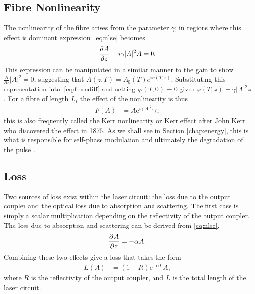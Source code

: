 \subsection{Fibre Nonlinearity}
The nonlinearity of the fibre arises from the parameter $\gamma$; in regions where this effect is dominant expression~\eqref{eq:nlse} becomes
\begin{align}
\label{eq:fibrediff}
	\frac{\partial^{}A}{\partial{z}^{}} - i \gamma |A|^2 A = 0.
\end{align}
This expression can be manipulated in a similar manner to the gain to show $\frac{\partial}{\partial z} |A|^2 = 0$, suggesting that $A(z,T) = A_0(T) e^{i \varphi(T,z)}$. Substituting this representation into~\eqref{eq:fibrediff} and setting $\varphi(T,0)=0$ gives $\varphi(T,z) = \gamma |A|^2 z$. For a fibre of length $L_f$ the effect of the nonlinearity is thus
\begin{align*}
F(A) &= A \textrm{e}^{i \gamma |A|^2 L_f},
\end{align*}
this is also frequently called the Kerr nonlinearity or Kerr effect after John Kerr who discovered the effect in 1875. As we shall see in Section \ref{chap:energy}, this is what is responsible for self-phase modulation and ultimately the degradation of the pulse \cite{desurvire, dunlop, martinez1984, tamura}.

\subsection{Loss}
Two sources of loss exist within the laser circuit: the loss due to the output coupler and the optical loss due to absorption and scattering. The first case is simply a scalar multiplication depending on the reflectivity of the output coupler. The loss due to absorption and scattering can be derived from \eqref{eq:nlse},
\begin{align*}
\frac{\partial^{}A}{\partial{z}^{}} = - \alpha A.
\end{align*}
Combining these two effects give a loss that takes the form
\begin{align*}
L(A) &= (1 - R) \textrm{e}^{- \alpha L}A,
\end{align*}
where $R$ is the reflectivity of the output coupler, and $L$ is the total length of the laser circuit.

